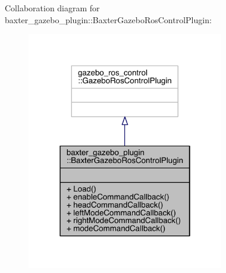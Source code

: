 Collaboration diagram for baxter\+\_\+gazebo\+\_\+plugin\+:\+:Baxter\+Gazebo\+Ros\+Control\+Plugin\+:
\nopagebreak
\begin{figure}[H]
\begin{center}
\leavevmode
\includegraphics[width=243pt]{classbaxter__gazebo__plugin_1_1_baxter_gazebo_ros_control_plugin__coll__graph}
\end{center}
\end{figure}
